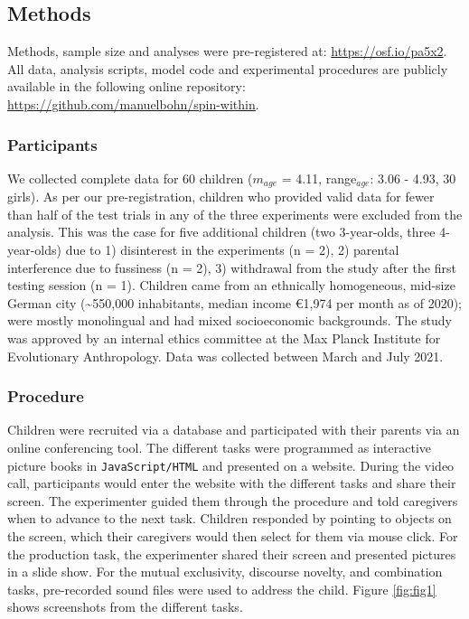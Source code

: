 \documentclass[
  man,floatsintext]{apa6}
\begin{document}
\hypertarget{methods}{%
\subsection{Methods}\label{methods}}

Methods, sample size and analyses were pre-registered at: \url{https://osf.io/pa5x2}. All data, analysis scripts, model code and experimental procedures are publicly available in the following online repository: \url{https://github.com/manuelbohn/spin-within}.

\hypertarget{participants}{%
\subsubsection{Participants}\label{participants}}

We collected complete data for 60 children (\(m_{age}\) = 4.11, range\(_{age}\): 3.06 - 4.93, 30 girls). As per our pre-registration, children who provided valid data for fewer than half of the test trials in any of the three experiments were excluded from the analysis. This was the case for five additional children (two 3-year-olds, three 4-year-olds) due to 1) disinterest in the experiments (n = 2), 2) parental interference due to fussiness (n = 2), 3) withdrawal from the study after the first testing session (n = 1). Children came from an ethnically homogeneous, mid-size German city (\textasciitilde550,000 inhabitants, median income €1,974 per month as of 2020); were mostly monolingual and had mixed socioeconomic backgrounds. The study was approved by an internal ethics committee at the Max Planck Institute for Evolutionary Anthropology. Data was collected between March and July 2021.

\hypertarget{procedure}{%
\subsubsection{Procedure}\label{procedure}}

Children were recruited via a database and participated with their parents via an online conferencing tool. The different tasks were programmed as interactive picture books in \texttt{JavaScript/HTML} and presented on a website. During the video call, participants would enter the website with the different tasks and share their screen. The experimenter guided them through the procedure and told caregivers when to advance to the next task. Children responded by pointing to objects on the screen, which their caregivers would then select for them via mouse click. For the production task, the experimenter shared their screen and presented pictures in a slide show. For the mutual exclusivity, discourse novelty, and combination tasks, pre-recorded sound files were used to address the child. Figure \ref{fig:fig1} shows screenshots from the different tasks.
\end{document}
